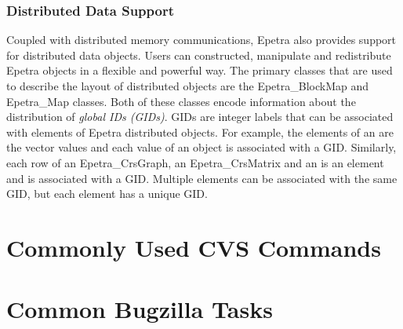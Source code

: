 \documentclass[12pt,relax]{EpetraUserGuide}
\newcommand{\map}{Epetra\_Map}
\newcommand{\blockmap}{Epetra\_BlockMap}
\newcommand{\crsgraph}{Epetra\_CrsGraph}
\newcommand{\crsmatrix}{Epetra\_CrsMatrix}
\begin{document}
\subsubsection{Distributed Data Support}

Coupled with distributed memory communications, Epetra also provides
support for distributed data objects.  Users can constructed,
manipulate and redistribute Epetra objects in a flexible and powerful
way.  The primary classes that are used to describe the layout of
distributed objects are the \blockmap{} and \map{} classes.  Both of
these classes encode information about the distribution of {\it global
IDs (GIDs)}. GIDs are integer labels that can be associated
with elements of  Epetra distributed objects.  For example, the
elements of an \vector{} are the vector values and each
value of an \vector{} object is associated with a GID.
Similarly, each row of an \crsgraph{}, an \crsmatrix{} and an
\multivector{} is an element and is associated with a GID.  Multiple
elements can be associated with the same GID, but each element has a
unique GID.


\clearpage



\appendix
\section{Commonly Used CVS Commands}
\label{Section:CVS}
\section{Common Bugzilla Tasks}
\label{Section:Bugzilla}
\end{document}
